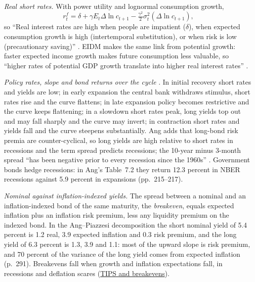 \begin{qfmethod}\label{meth:cycle-rates-breakevens-spreads}
 \emph{Real short rates.} With power utility and lognormal consumption growth,
\[
r^f_t=\delta+\gamma E_t\Delta\ln c_{t+1}-\tfrac{\gamma^2}{2}\sigma_t^2(\Delta\ln c_{t+1}),
\]
so ``Real interest rates are high when people are impatient ($\delta$), when expected consumption growth is high (intertemporal substitution), or when risk is low (precautionary saving)'' \citep[sec.~1.4.1, eq.~(1.7), p.~20]{asset-pricing-manuscript-2000}. EIDM makes the same link from potential growth: faster expected income growth makes future consumption less valuable, so ``higher rates of potential GDP growth translate into higher real interest rates'' \citep[chap.~11, sec.~3, p.~633]{economics-investment-decision-makers-2013}.

\emph{Policy rates, slope and bond returns over the cycle} \citep[chap.~3, sec.~3.4.1, pp.~62--64]{portfolio-management-in-practice-v1-2020}. In initial recovery short rates and yields are low; in early expansion the central bank withdraws stimulus, short rates rise and the curve flattens; in late expansion policy becomes restrictive and the curve keeps flattening; in a slowdown short rates peak, long yields top out and may fall sharply and the curve may invert; in contraction short rates and yields fall and the curve steepens substantially. Ang adds that long-bond risk premia are counter-cyclical, so long yields are high relative to short rates in recessions and the term spread predicts recessions; the 10-year minus 3-month spread ``has been negative prior to every recession since the 1960s'' \citep[chap.~9, sec.~3, pp.~291--292]{s7-ang}. Government bonds hedge recessions: in Ang's Table~7.2 they return 12.3 percent in NBER recessions against 5.9 percent in expansions (pp.~215--217).

\emph{Nominal against inflation-indexed yields.} The spread between a nominal and an inflation-indexed bond of the same maturity, the \emph{breakeven}, equals expected inflation plus an inflation risk premium, less any liquidity premium on the indexed bond. In the Ang--Piazzesi decomposition the short nominal yield of 5.4 percent is 1.2 real, 3.9 expected inflation and 0.3 risk premium, and the long yield of 6.3 percent is 1.3, 3.9 and 1.1: most of the upward slope is risk premium, and 70 percent of the variance of the long yield comes from expected inflation (p.~291). Breakevens fall when growth and inflation expectations fall, in recessions and deflation scares (\hyperref[def:tips-breakevens]{TIPS and breakevens}).


\end{qfmethod}
